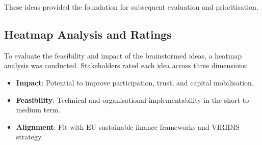 \documentclass[
  english,
  12pt,
  oneside,
  open=any]{scrbook}
\providecommand{\tightlist}{%
  \setlength{\itemsep}{0pt}\setlength{\parskip}{0pt}}\usepackage{longtable,booktabs,array}
\begin{document}
These ideas provided the foundation for subsequent evaluation and
prioritisation.

\subsection{Heatmap Analysis and Ratings}\label{sec-heatmap}

To evaluate the feasibility and impact of the brainstormed ideas, a
heatmap analysis was conducted. Stakeholders rated each idea across
three dimensions:

\begin{itemize}
\tightlist
\item
  \textbf{Impact}: Potential to improve participation, trust, and
  capital mobilisation.\\
\item
  \textbf{Feasibility}: Technical and organisational implementability in
  the short-to-medium term.\\
\item
  \textbf{Alignment}: Fit with EU sustainable finance frameworks and
  VIRIDIS strategy.
\end{itemize}
\end{document}
